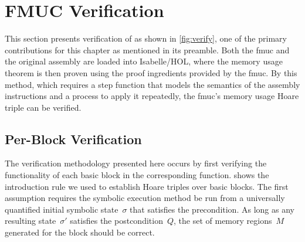 \section{FMUC Verification}\label{se:fmuc_ver}
This section presents verification of  as shown in \cref{fig:verify},
one of the primary contributions for this chapter as mentioned in its preamble.
Both the \ac{fmuc} and the original assembly are loaded into Isabelle/HOL,
where the memory usage theorem is then proven using the proof ingredients
provided by the \ac{fmuc}.
By this method, which requires a step function%
that models the semantics of the assembly instructions%
and a process to apply it repeatedly,
the \ac{fmuc}'s memory usage Hoare triple can be verified.%

\begin{figure*}
  \centering
  \caption{Overview of \acs*{fmuc} verification}\label{fig:verify}
\end{figure*}

\subsection{Per-Block Verification}\label{sse:per-block}
The verification methodology presented here occurs 
by first verifying the functionality of each basic block in the corresponding function.
 shows the introduction rule we used
to establish Hoare triples over basic blocks.
The first assumption requires the symbolic execution method be run from a universally quantified initial symbolic state~$\sigma$ that satisfies the precondition.
As long as any resulting state~$\sigma'$ satisfies the postcondition~$Q$,
the set of memory regions~$M$ generated for the block should be correct.


